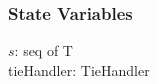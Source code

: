 \documentclass[12pt,fleqn]{examtst}
\begin{document}
\begin{minipage}{\textwidth}
\begin{enumerate}[a.]
\begin{tabular}{| l | l | l | p{6cm} |}
\end{tabular}

\subsubsection* {State Variables}

$s$: seq of T\\
tieHandler: TieHandler

\end{enumerate}
\end{minipage}

\end{document}
